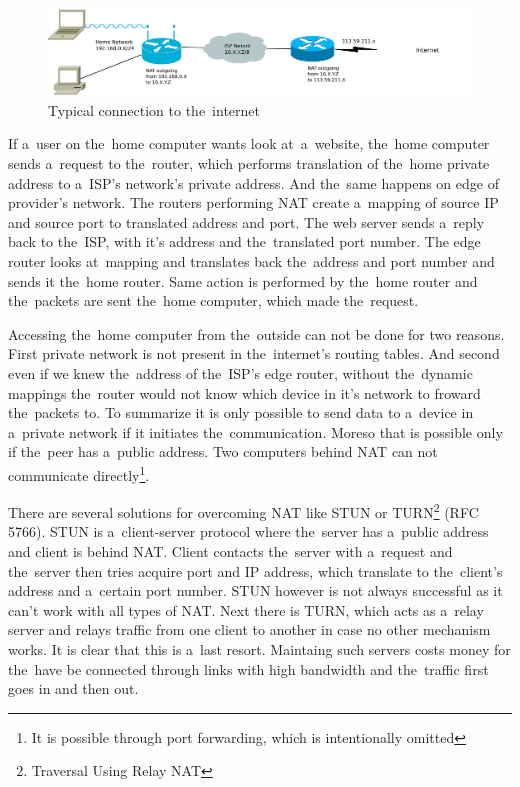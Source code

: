 \begin{figure}[ht]
	\begin{center}
	\includegraphics[width=15cm]{fig/nat-diagram.pdf}
	\caption{Typical connection to the~internet}
	\label{fig:nat-diagram}
\end{center}
\end{figure}

If a~user on the~home computer wants look at~a~website, the~home computer sends a~request to the~router, which performs translation of the~home private address to a~ISP's network's private address. And the~same happens on edge of provider's network. The routers performing NAT create a~mapping of source IP and source port to translated address and port. The web server sends a~reply back to the~ISP, with it's address and the~translated port number. The edge router looks at~mapping and translates back the~address and port number and sends it the~home router. Same action is performed by the~home router and the~packets are sent the~home computer, which made the~request. 

Accessing the~home computer from the~outside can not be done for two reasons. First private network is not present in the~internet's routing tables. And second even if we knew the~address of the~ISP's edge router, without the~dynamic mappings the~router would not know which device in it's network to froward the~packets to. To summarize it is only possible to send data to a~device in a~private network if it initiates the~communication. Moreso that is possible only if the~peer has a~public address. Two computers behind NAT can not communicate directly\footnote{It is possible through port forwarding, which is intentionally omitted}.  

There are several solutions for overcoming NAT like STUN or TURN\footnote{Traversal Using Relay NAT} (RFC 5766). STUN is a~client-server protocol where the~server has a~public address and client is behind NAT. Client contacts the~server with a~request and the~server then tries acquire port and IP address, which translate to the~client's address and a~certain port number. STUN however is not always successful as it can't work with all types of NAT. Next there is TURN, which acts as a~relay server and relays traffic from one client to another in case no other mechanism works. It is clear that this is a~last resort. Maintaing such servers costs money for the~have be connected through links with high bandwidth and the~traffic first goes in and then out.


